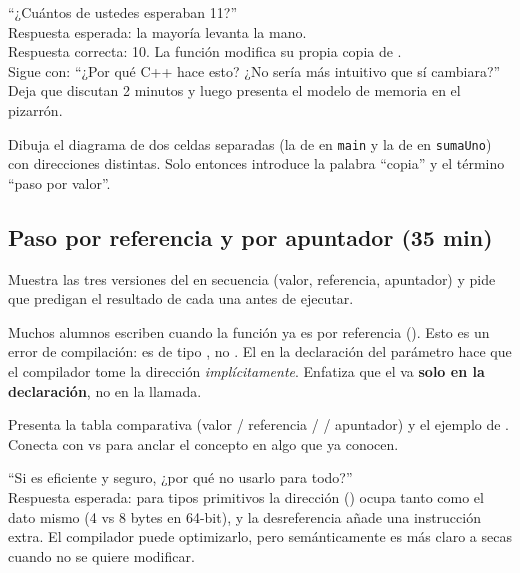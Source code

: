 \documentclass[12pt, oneside]{article}
\begin{document}
\begin{notaprofesor}
  ``¿Cuántos de ustedes esperaban 11?''\\
  Respuesta esperada: la mayoría levanta la mano.\\
  Respuesta correcta: 10. La función modifica su propia copia de .\\
  Sigue con: ``¿Por qué C++ hace esto? ¿No sería más intuitivo que sí cambiara?''
  Deja que discutan 2 minutos y luego presenta el modelo de memoria en el pizarrón.
\end{notaprofesor}

Dibuja el diagrama de dos celdas separadas (la de  en \texttt{main} y la
de  en \texttt{sumaUno}) con direcciones distintas. Solo entonces introduce
la palabra ``copia'' y el término ``paso por valor''.

\subsection{Paso por referencia y por apuntador (35 min)}

Muestra las tres versiones del  en secuencia (valor, referencia,
apuntador) y pide que predigan el resultado de cada una antes de ejecutar.

\begin{notaprofesor}
  Muchos alumnos escriben  cuando la función ya es por
  referencia (). Esto es un error de compilación:  es
  de tipo , no . El \cpp{\&} en la declaración del
  parámetro hace que el compilador tome la dirección \textit{implícitamente}.
  Enfatiza que el \cpp{\&} va \textbf{solo en la declaración}, no en la llamada.
\end{notaprofesor}

Presenta la tabla comparativa (valor / referencia /  / apuntador)
y el ejemplo de . Conecta con  vs 
para anclar el concepto en algo que ya conocen.

\begin{notaprofesor}
  ``Si  es eficiente y seguro, ¿por qué no usarlo para todo?''\\
  Respuesta esperada: para tipos primitivos la dirección () ocupa
  tanto como el dato mismo (4 vs 8 bytes en 64-bit), y la desreferencia añade
  una instrucción extra. El compilador puede optimizarlo, pero semánticamente
  es más claro  a secas cuando no se quiere modificar.
\end{notaprofesor}
\end{document}
